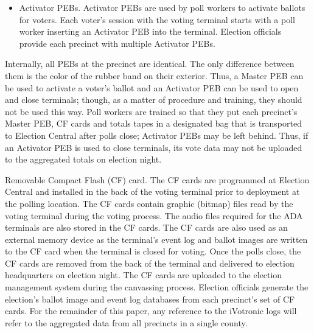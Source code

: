 \documentclass[letterpaper,twocolumn,10pt]{article}
\begin{document}
\begin{description}
\begin{itemize}
  (through PEB readers) and included in the official tally.
\item{Activator PEBs.} Activator PEBs are used by poll workers to activate ballots
  for voters. Each voter's session with the voting terminal starts with a poll
  worker inserting an Activator PEB into the terminal. Election officials provide 
  each precinct with multiple Activator PEBs. 
\end{itemize}

Internally, all PEBs at the precinct are identical. The only
difference between them is the color of the rubber band on their
exterior. Thus, a Master PEB can be used to activate a voter's ballot
and an Activator PEB can be used to open and close terminals; though,
as a matter of procedure and training, they should not be used this
way. Poll workers are trained so that they put each precinct's Master
PEB, CF cards and totals tapes in a designated bag that is
transported to Election Central after polls close; Activator PEBs
may be left behind. Thus, if an Activator PEB is used to close terminals, its
vote data may not be uploaded to the aggregated totals on
election night.

\item{Removable Compact Flash (CF) card.} The CF cards are programmed at Election
  Central and installed in the back of the voting terminal prior to deployment
  at the polling location. The CF cards contain graphic (bitmap) files read by 
  the voting terminal during the voting process. The audio files required for the 
  ADA terminals are also stored in the CF cards. The CF cards are also used as an 
  external memory device as the terminal's event log and ballot images are written 
  to the CF card when the terminal is closed for voting. Once the polls close, the 
  CF cards are removed from the back of the terminal and delivered to election 
  headquarters on election night. The CF cards are uploaded to the election management 
  system during the canvassing process. Election officials generate the election's 
  ballot image and event log databases from each precinct's set of CF cards.  For the 
  remainder of this paper, any reference to the iVotronic logs will refer to the 
  aggregated data from all precincts in a single county.
\end{description}
\end{document}
